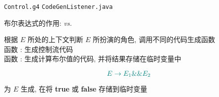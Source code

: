 \begin{frame}{}
\end{frame}

\begin{frame}{}
\end{frame}

\begin{frame}{}
  \begin{center}
    \texttt{Control.g4} \qquad \texttt{CodeGenListener.java}


  \end{center}
\end{frame}

\begin{frame}{}
  \begin{center}
    {\Large 布尔表达式的作用:  \emph{vs.} }

    \vspace{0.50cm}

    \pause
    \vspace{0.50cm}
    根据 $E$ 所处的上下文判断 $E$ 所扮演的角色, 调用不同的代码生成函数 \\[15pt]

    函数 : 生成控制流代码 \\[6pt]
    函数 : 生成计算布尔值的代码, 并将结果存储在临时变量中
  \end{center}
\end{frame}

\begin{frame}{}
  \begin{center}

    \[
      \textcolor{teal}{E \to E_{1} \&\& E_{2}}
    \]

    为 $E$ 生成,
    在将 {\bf true} 或 {\bf false} 存储到临时变量
  \end{center}
\end{frame}
